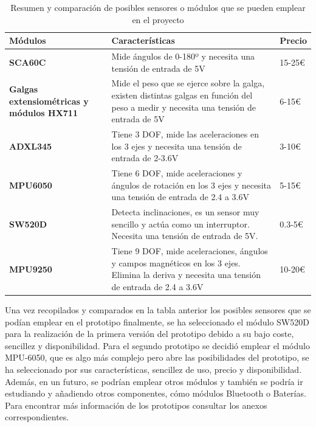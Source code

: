 \newpage


\begin{table}[h!]
\centering
\begin{tabular}{ |m{3.5cm}|m{8.5cm}|m{2cm}|  } 
\hline
\cellcolor[HTML]{B9E3F0}\textbf{Módulos} & \cellcolor[HTML]{B9E3F0}\textbf{Características} & \cellcolor[HTML]{B9E3F0}\textbf{Precio}\\

\hline
\cellcolor[HTML]{EFEFEF}\textbf{SCA60C}             & {Mide ángulos de 0-180º y necesita una tensión de entrada de 5V}   & 15-25€\\
\hline
\cellcolor[HTML]{EFEFEF}\textbf{Galgas extensiométricas y módulos HX711}                & {Mide el peso que se ejerce sobre la galga, existen distintas galgas en función del peso a medir y necesita una tensión de entrada de 5V} & 6-15€\\
\hline
\cellcolor[HTML]{EFEFEF}\textbf{ADXL345}                & {Tiene 3 DOF, mide las aceleraciones en los 3 ejes y necesita una tensión de entrada de 2-3.6V} & 3-10€\\
\hline
\cellcolor[HTML]{EFEFEF}\textbf{MPU6050}                & {Tiene 6 DOF, mide aceleraciones y ángulos de rotación en los 3 ejes y necesita una tensión de entrada de 2.4 a 3.6V} & 5-15€\\
\hline
\cellcolor[HTML]{EFEFEF}\textbf{SW520D}                & {Detecta inclinaciones, es un sensor muy sencillo y actúa como un interruptor. Necesita una tensión de entrada de 5V.} & 0.3-5€\\
\hline
\cellcolor[HTML]{EFEFEF}\textbf{MPU9250}                & {Tiene 9 DOF, mide aceleraciones, ángulos y campos magnéticos en los 3 ejes. Elimina la deriva y necesita una tensión de entrada de 2.4 a 3.6V} & 10-20€\\
\hline
\end{tabular}
\caption{Resumen y comparación de posibles sensores o módulos que se pueden emplear en el proyecto}
\end{table}


Una vez recopilados y comparados en la tabla anterior los posibles sensores que se podían emplear en el prototipo finalmente, se ha seleccionado el módulo SW520D para la realización de la primera versión del prototipo debido a su bajo coste, sencillez y disponibilidad. Para el segundo prototipo se decidió emplear el módulo MPU-6050, que es algo más complejo pero abre las posibilidades del prototipo, se ha seleccionado por sus características, sencillez de uso, precio y disponibilidad. Además, en un futuro, se podrían emplear otros módulos y también se podría ir estudiando y añadiendo otros componentes, cómo módulos Bluetooth o Baterías. Para encontrar más información de los prototipos consultar los anexos correspondientes.